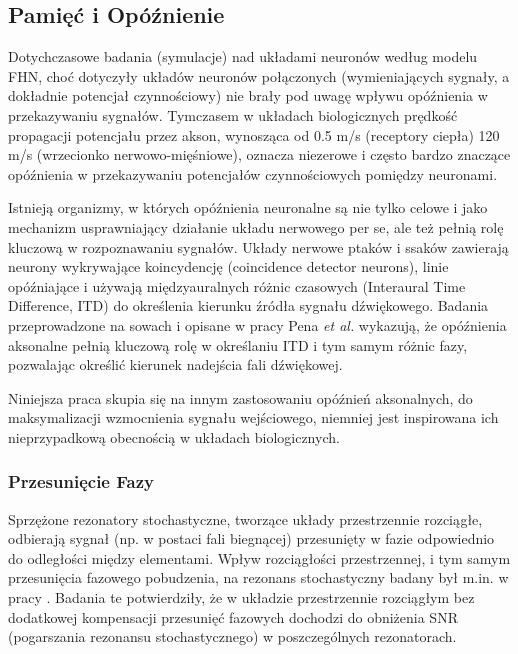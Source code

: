   \subsection{Pamięć i Opóźnienie}
  
  Dotychczasowe badania (symulacje) nad układami neuronów według modelu FHN, choć dotyczyły układów neuronów połączonych (wymieniających sygnały, a dokładnie potencjał czynnościowy) nie brały pod uwagę wpływu opóźnienia w przekazywaniu sygnałów. Tymczasem w układach biologicznych prędkość propagacji potencjału przez akson, wynosząca od 0.5 m/s (receptory ciepła) 120 m/s (wrzecionko nerwowo-mięśniowe), oznacza niezerowe i często bardzo znaczące opóźnienia w przekazywaniu potencjałów czynnościowych pomiędzy neuronami. \cite{kandel}

  Istnieją organizmy, w których opóźnienia neuronalne są nie tylko celowe i jako mechanizm usprawniający działanie układu nerwowego per se, ale też pełnią rolę kluczową w rozpoznawaniu sygnałów. Układy nerwowe ptaków i ssaków zawierają neurony wykrywające koincydencję (coincidence detector neurons), linie opóźniające i używają międzyauralnych różnic czasowych (Interaural Time Difference, ITD) do określenia kierunku źródła sygnału dźwiękowego. Badania przeprowadzone na sowach i opisane w pracy Pena \emph{et al.} \cite{pena} wykazują, że opóźnienia aksonalne pełnią kluczową rolę w określaniu ITD i tym samym różnic fazy, pozwalając określić kierunek nadejścia fali dźwiękowej.

  Niniejsza praca skupia się na innym zastosowaniu opóźnień aksonalnych, do maksymalizacji wzmocnienia sygnału wejściowego, niemniej jest inspirowana ich nieprzypadkową obecnością w układach biologicznych.
  

  \subsubsection{Przesunięcie Fazy}
  \label{sec:przesuniecie_fazy}

  Sprzężone rezonatory stochastyczne, tworzące układy przestrzennie rozciągłe, odbierają sygnał (np. w postaci fali biegnącej) przesunięty w fazie odpowiednio do odległości między elementami. Wpływ rozciągłości przestrzennej, i tym samym przesunięcia fazowego pobudzenia, na rezonans stochastyczny badany był m.in. w pracy \cite{ijmpb_14_8}. Badania te potwierdziły, że w układzie przestrzennie rozciągłym bez dodatkowej kompensacji przesunięć fazowych dochodzi do obniżenia SNR (pogarszania rezonansu stochastycznego) w poszczególnych rezonatorach.

